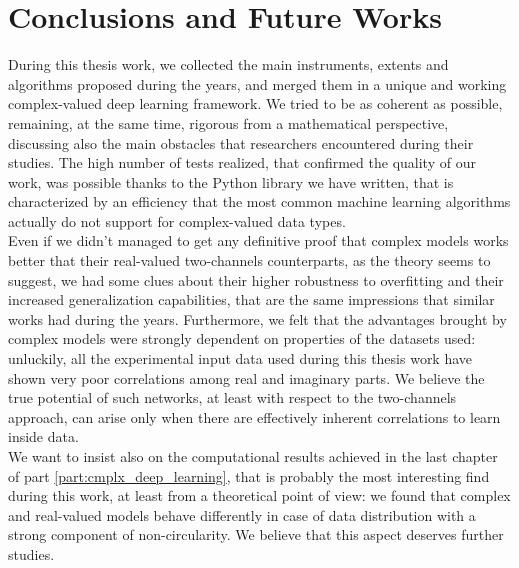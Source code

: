 \documentclass[../main.tex]{subfiles}
\begin{document}
	

\chapter*{Conclusions and Future Works}

During this thesis work, we collected the main instruments, extents and algorithms proposed during the years, and merged them in a unique and working complex-valued deep learning framework. We tried to be as coherent as possible, remaining, at the same time, rigorous from a mathematical perspective, discussing also the main obstacles that researchers encountered during their studies. The high number of tests realized, that confirmed the quality of our work, was possible thanks to the Python library we have written, that is characterized by an efficiency that the most common machine learning algorithms actually do not support for complex-valued data types.\\
Even if we didn't managed to get any definitive proof that complex models works better that their real-valued two-channels counterparts, as the theory seems to suggest, we had some clues about their higher robustness to overfitting and their increased generalization capabilities, that are the same impressions that similar works had during the years. Furthermore, we felt that the advantages brought by complex models were strongly dependent on properties of the datasets used: unluckily, all the experimental input data used during this thesis work have shown very poor correlations among real and imaginary parts. We believe the true potential of such networks, at least with respect to the two-channels approach, can arise only when there are effectively inherent correlations to learn inside data. \\
We want to insist also on the computational results achieved in the last chapter of part \ref{part:cmplx_deep_learning}, that is probably the most interesting find during this work, at least from a theoretical point of view: we found that complex and real-valued models behave differently in case of data distribution with a strong component of non-circularity. We believe that this aspect deserves further studies.
	
	
	
\end{document}

